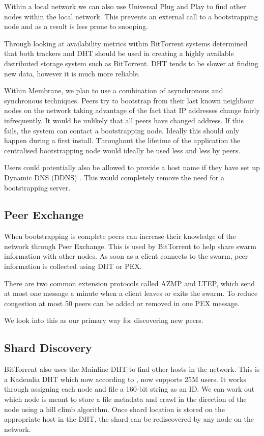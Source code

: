 \documentclass[11pt, a4paper, twocolumn, twoside]{report}
\begin{document}
Within a local network we can also use Universal Plug and Play to find other nodes within the local network. This prevents an external call to a bootstrapping node and as a result is less prone to snooping.

Through looking at availability metrics within BitTorrent systems \cite{neglia2007availability} determined that both trackers and DHT should be used in creating a highly available distributed storage system such as BitTorrent. DHT tends to be slower at finding new data, however it is much more reliable.

Within Membrane, we plan to use a combination of asynchronous and synchronous techniques. Peers try to bootstrap from their last known neighbour nodes on the network taking advantage of the fact that IP addresses change fairly infrequently. It would be unlikely that all peers have changed address. If this fails, the system can contact a bootstrapping node. Ideally this should only happen during a first install. Throughout the lifetime of the application the centralised bootstrapping node would ideally be used less and less by peers.

Users could potentially also be allowed to provide a host name if they have set up Dynamic DNS (DDNS) \citep{bound1997dynamic}. This would completely remove the need for a bootstrapping server.

\subsection{Peer Exchange} \label{sec:pex}

When bootstrapping is complete peers can increase their knowledge of the network through Peer Exchange. This is used by BitTorrent to help share swarm information with other nodes. As soon as a client connects to the swarm, peer information is collected using DHT or PEX.

There are two common extension protocols called AZMP and LTEP, which send at most one message a minute when a client leaves or exits the swarm. To reduce congestion at most 50 peers can be added or removed in one PEX message. \citep{vuze2010vuze}

We look into this as our primary way for discovering new peers.

\subsection{Shard Discovery}

BitTorrent also uses the Mainline DHT to find other hosts in the network. This is a Kademlia DHT which now according to \cite{jones2015mainlinedht}, now supports 25M users. It works through assigning each node and file a 160-bit string as an ID. We can work out which node is meant to store a file metadata and crawl in the direction of the node using a hill climb algorithm. Once shard location is stored on the appropriate host in the DHT, the shard can be rediscovered by any node on the network.
\end{document}
